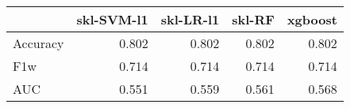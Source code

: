 \begin{tabular}{lrrrr}
\toprule
{} &  skl-SVM-l1 &  skl-LR-l1 &  skl-RF &  xgboost \\
\midrule
Accuracy &       0.802 &      0.802 &   0.802 &    0.802 \\
F1w      &       0.714 &      0.714 &   0.714 &    0.714 \\
AUC      &       0.551 &      0.559 &   0.561 &    0.568 \\
\bottomrule
\end{tabular}
